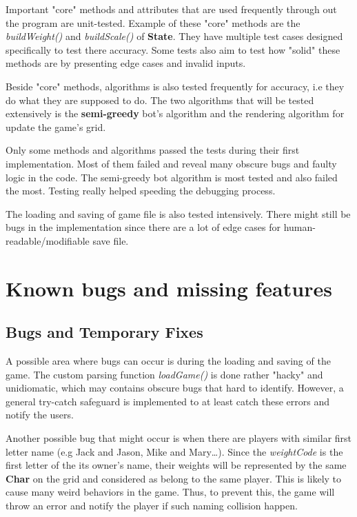 \documentclass[12pt]{article}
\begin{document}
Important "core" methods and attributes that are used frequently through out the
program are unit-tested. Example of these "core" methods are the
\textit{buildWeight()} and \textit{buildScale()} of \textbf{State}. They have
multiple test cases designed specifically to test there accuracy. Some tests
also aim to test how "solid" these methods are by presenting edge cases and
invalid inputs.

Beside "core" methods, algorithms is also tested frequently for accuracy, i.e
they do what they are supposed to do. The two algorithms that will be tested
extensively is the \textbf{semi-greedy} bot's algorithm and the rendering
algorithm for update the game's grid. 

Only some methods and algorithms passed the tests during their first
implementation. Most of them failed and reveal many obscure bugs and faulty
logic in the code. The semi-greedy bot algorithm is most tested and also failed
the most. Testing really helped speeding the debugging process.

The loading and saving of game file is also tested intensively. There might
still be bugs in the implementation since there are a lot of edge cases for
human-readable/modifiable save file.

\section{Known bugs and missing features}

\subsection{Bugs and Temporary Fixes}

A possible area where bugs can occur is during the loading and saving of the
game. The custom parsing function \textit{loadGame()} is done rather "hacky" and
unidiomatic, which may contains obscure bugs that hard to identify. However, a
general try-catch safeguard is implemented to at least catch these errors and
notify the users.

Another possible bug that might occur is when there are players with similar
first letter name (e.g Jack and Jason, Mike and Mary\dots). Since the
\textit{weightCode} is the first letter of the its owner's name, their weights
will be represented by the same \textbf{Char} on the grid and considered as
belong to the same player. This is likely to cause many weird behaviors in the
game. Thus, to prevent this, the game will throw an error and notify the player
if such naming collision happen.
\end{document}
